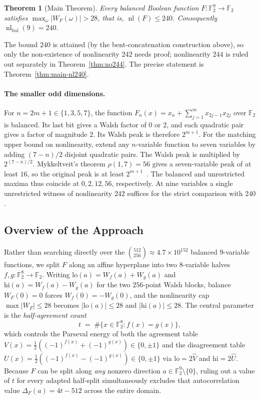 \documentclass[11pt]{article}
\newtheorem*{theorem*}{Theorem}
\theoremstyle{definition}
\newcommand{\F}{\mathbb{F}}
\newcommand{\nl}{\operatorname{nl}}
\begin{document}
\begin{theorem*}[Main Theorem]
Every balanced Boolean function $F:\F_2^9\to\F_2$ satisfies $\max_{\omega}|W_F(\omega)|>28$, that is, $\nl(F)\le 240$.
Consequently $\nl_{\mathrm{bal}}(9)=240$.
\end{theorem*}

The bound $240$ is attained (by the bent-concatenation construction above), so only the non-existence of nonlinearity $242$ needs proof; nonlinearity $244$ is ruled out separately in Theorem~\ref{thm:no244}.
The precise statement is Theorem~\ref{thm:main-nl240}.

\paragraph{The smaller odd dimensions.}
For $n=2m+1\in\{1,3,5,7\}$, the function
$F_n(x)=x_n+\sum_{j=1}^{m}x_{2j-1}x_{2j}$ over $\F_2$ is balanced.
Its last bit gives a Walsh factor of $0$ or $2$, and each quadratic pair
gives a factor of magnitude $2$. Its Walsh peak is therefore $2^{m+1}$.
For the matching upper bound on nonlinearity, extend any $n$-variable
function to seven variables by adding $(7-n)/2$ disjoint quadratic pairs.
The Walsh peak is multiplied by $2^{(7-n)/2}$. Mykkeltveit's theorem
$\rho(1,7)=56$ gives a seven-variable peak of at least $16$,
so the original peak is at least $2^{m+1}$~\cite{Mykkeltveit1980}.
The balanced and unrestricted maxima thus coincide at $0,2,12,56$,
respectively. At nine variables a single unrestricted witness of
nonlinearity $242$ suffices for the strict comparison with $240$.

\subsection{Overview of the Approach}
Rather than searching directly over the $\binom{512}{256} \approx 4.7 \times 10^{152}$ balanced $9$-variable functions, we split $F$ along an affine hyperplane into two $8$-variable halves $f, g : \F_2^8 \to \F_2$.
Writing $\mathrm{lo}(a) = W_f(a) + W_g(a)$ and $\mathrm{hi}(a) = W_f(a) - W_g(a)$ for the two $256$-point Walsh blocks, balance $W_F(0) = 0$ forces $W_f(0) = -W_g(0)$, and the nonlinearity cap $\max |W_F| \le 28$ becomes $|\mathrm{lo}(a)| \le 28$ and $|\mathrm{hi}(a)| \le 28$.
The central parameter is the \emph{half-agreement count}
\[
  t \;=\; \#\{x \in \F_2^8 : f(x) = g(x)\},
\]
which controls the Parseval energy of both the agreement table $V(x) = \frac{1}{2}((-1)^{f(x)} + (-1)^{g(x)}) \in \{0, \pm 1\}$ and the disagreement table $U(x) = \frac{1}{2}((-1)^{f(x)} - (-1)^{g(x)}) \in \{0, \pm 1\}$ via $\mathrm{lo} = 2\widehat{V}$ and $\mathrm{hi} = 2\widehat{U}$.
Because $F$ can be split along \emph{any} nonzero direction $a \in \F_2^9 \setminus \{0\}$, ruling out a value of $t$ for every adapted half-split simultaneously excludes that autocorrelation value $\Delta_F(a) = 4t - 512$ across the entire domain.
\end{document}
